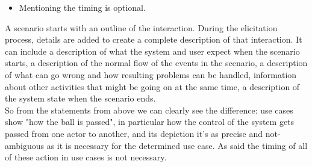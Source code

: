 \begin{parlist}
\begin{enumerate}
\begin{itemize}
					\item Mentioning the timing is optional.
				\end{itemize}			
		\end{enumerate}
	\item A scenario starts with an outline of the interaction. During the elicitation process, details are added to create a complete description of that interaction. It can include a description of what the system and user expect when the scenario starts, a description of the normal flow of the events in the scenario, a description of what can go wrong and how resulting problems can be handled, information about other activities that might be going on at the same time, a description of the system state when the scenario ends.\cite{Sommerville:2004aa}\\ So from the statements from above we can clearly see the difference: use cases show "how the ball is passed", in particular how the control of the system gets passed from one actor to another, and its depiction it's as precise and not-ambiguous as it is necessary for the determined use case. As said the timing of all of these action in use cases is not necessary.
	
\end{parlist}